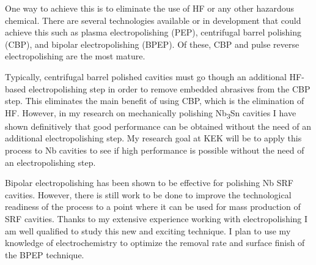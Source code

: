 \documentclass[]{revtex4-2}
\begin{document}
    One way to achieve this is to eliminate the use of HF or any other hazardous chemical. There are several technologies available or in development that could achieve this such as plasma electropolishing (PEP), centrifugal barrel polishing (CBP), and bipolar electropolishing (BPEP). Of these, CBP and pulse reverse electropolishing are the most mature.

    Typically, centrifugal barrel polished cavities must go though an additional HF-based electropolishing step in order to remove embedded abrasives from the CBP step. This eliminates the main benefit of using CBP, which is the elimination of HF. However, in my research on mechanically polishing Nb\textsubscript{3}Sn cavities I have shown definitively that good performance can be obtained without the need of an additional electropolishing step. My research goal at KEK will be to apply this process to Nb cavities to see if high performance is possible without the need of an electropolishing step.

    Bipolar electropolishing has been shown to be effective for polishing Nb SRF cavities. However, there is still work to be done to improve the technological readiness of the process to a point where it can be used for mass production of SRF cavities. Thanks to my extensive experience working with electropolishing I am well qualified to study this new and exciting technique. I plan to use my knowledge of electrochemistry to optimize the removal rate and surface finish of the BPEP technique. 
\end{document}
